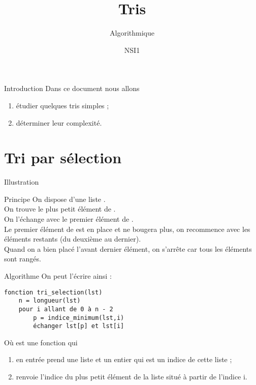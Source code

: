 \documentclass[10pt]{beamer}
\title{Tris}
\subtitle{Algorithmique}
\author{NSI1}
\begin{document}
    \maketitle
    

\begin{frame}{Introduction}
Dans ce document nous allons
\begin{enumerate}[--]
	\item étudier quelques tris simples ;
    \item déterminer leur complexité.
\end{enumerate}
\end{frame}
\section{Tri par sélection}
\begin{frame}{Illustration}
        \begin{center}
    \end{center}
\end{frame}
\begin{frame}{Principe}
On dispose d'une liste .\\
On trouve le plus petit élément de .\\
On l'échange avec le premier élément de .\\
Le premier élément de  est en place et ne bougera plus, on recommence avec les éléments restants (du deuxième au dernier).\\
Quand on a bien placé l'avant dernier élément, on s'arrête car tous les éléments sont rangés.
\end{frame}
\begin{frame}[fragile]{Algorithme}
On peut l'écrire ainsi :
\begin{verbatim}
fonction tri_selection(lst)
    n = longueur(lst)
    pour i allant de 0 à n - 2
        p = indice_minimum(lst,i)
        échanger lst[p] et lst[i]
\end{verbatim}
Où  est une fonction qui 
\begin{enumerate}[--]
	\item en entrée prend une liste et un entier qui est un indice de cette liste ;
    \item renvoie l'indice du plus petit élément de la liste situé à partir de l'indice i.
\end{enumerate}
\end{frame}
\end{document}
